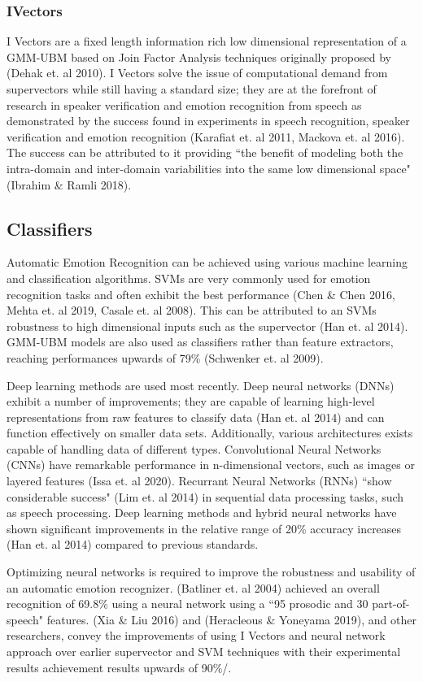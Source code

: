 \subsubsection{IVectors}
    I Vectors are a fixed length information rich low dimensional representation of a GMM-UBM based on Join Factor Analysis techniques originally proposed by (Dehak et. al 2010). I Vectors solve the issue of computational demand from supervectors while still having a standard size; they are at the forefront of research in speaker verification and emotion recognition from speech as demonstrated by the success found in experiments in speech recognition, speaker verification and emotion recognition (Karafiat et. al 2011, Mackova et. al 2016). The success can be attributed to it providing ``the benefit of modeling both the intra-domain and inter-domain variabilities into the same low dimensional space" (Ibrahim \& Ramli 2018).
\subsection{Classifiers}
	Automatic Emotion Recognition can be achieved using various machine learning and classification algorithms.
	SVMs are very commonly used for emotion recognition tasks and often exhibit the best performance (Chen \& Chen 2016, Mehta et. al 2019, Casale et. al 2008). This can be attributed to an SVMs robustness to high dimensional inputs such as the supervector (Han et. al 2014). GMM-UBM models are also used as classifiers rather than feature extractors, reaching performances upwards of 79\% (Schwenker et. al 2009).

	Deep learning methods are used most recently. Deep neural networks (DNNs) exhibit a number of improvements; they are capable of learning high-level representations from raw features to classify data (Han et. al 2014) and can function effectively on smaller data sets. Additionally, various architectures exists capable of handling data of different types. Convolutional Neural Networks (CNNs) have remarkable performance in n-dimensional vectors, such as images or layered features (Issa et. al 2020). Recurrant Neural Networks (RNNs) ``show considerable success" (Lim et. al 2014) in sequential data processing tasks, such as speech processing. Deep learning methods and hybrid neural networks have shown significant improvements in the relative range of 20\% accuracy increases (Han et. al  2014) compared to previous standards.
	
	Optimizing neural networks is required to improve the robustness and usability of an automatic emotion recognizer. (Batliner et. al 2004) achieved an overall recognition of 69.8\% using a neural network using a ``95 prosodic and 30 part-of-speech" features. (Xia \& Liu 2016) and (Heracleous \& Yoneyama 2019), and other researchers, convey the improvements of using I Vectors and neural network approach over earlier supervector and SVM techniques with their experimental results achievement results upwards of 90\%/.

